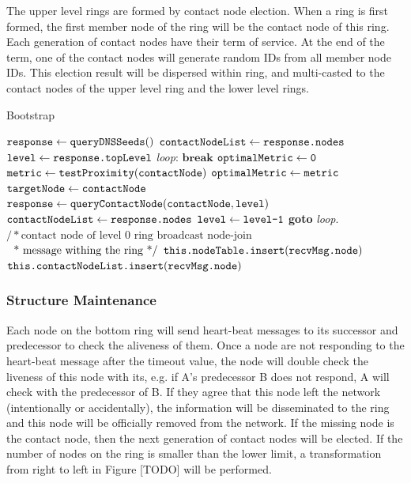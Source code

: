 The upper level rings are formed by contact node election. When a ring is first formed, the first member node of the ring will be the contact node of this ring. Each generation of contact nodes have their term of service. At the end of the term, one of the contact nodes will generate random IDs from all member node IDs. This election result will be dispersed within ring, and multi-casted to the contact nodes of the upper level ring and the lower level rings.

\begin{algorithm}
	\caption{Bootstrap}\label{euclid}
	\begin{algorithmic}[1]
		\State $\texttt{response} \gets \texttt{queryDNSSeeds}()$
		\State $\texttt{contactNodeList} \gets \texttt{response.nodes}$
		\State $\texttt{level} \gets \texttt{response.topLevel}$
		\BState \emph{loop}:
		\State $\textbf{break}$
		\Else
		\State $\texttt{optimalMetric} \gets \texttt{0}$
		\State $\texttt{metric} \gets \texttt{testProximity}(\texttt{contactNode})$
		\State $\texttt{optimalMetric} \gets \texttt{metric}$
		\State $\texttt{targetNode} \gets \texttt{contactNode}$
		\EndIf
		\EndFor
		\State $\texttt{response} \gets \texttt{queryContactNode}(\texttt{contactNode}, \texttt{level})$
		\State $\texttt{contactNodeList} \gets \texttt{response.nodes}$
		\State $\texttt{level} \gets \texttt{level}\texttt{-1}$
		\State \textbf{goto} \emph{loop}.
		\EndIf
		\State $/* \text{contact node of level 0 ring broadcast node-join}$
		\State $\text{\; * message withing the ring */}$
		\State $\texttt{this.}\texttt{nodeTable.insert}(\texttt{recvMsg.node})$
		\State $\texttt{this.}\texttt{contactNodeList.insert}(\texttt{recvMsg.node})$
		\EndIf
		\EndProcedure
	\end{algorithmic}
\end{algorithm}

\subsubsection{Structure Maintenance} \label{maintain}

Each node on the bottom ring will send heart-beat messages to its successor and predecessor to check the aliveness of them. Once a node are not responding to the heart-beat message after the timeout value, the node will double check the liveness of this node with its, e.g. if A's predecessor B does not respond, A will check with the predecessor of B. If they agree that this node left the network (intentionally or accidentally), the information will be disseminated to the ring and this node will be officially removed from the network. If the missing node is the contact node, then the next generation of contact nodes will be elected. If the number of nodes on the ring is smaller than the lower limit, a transformation from right to left in Figure [TODO] will be performed.

